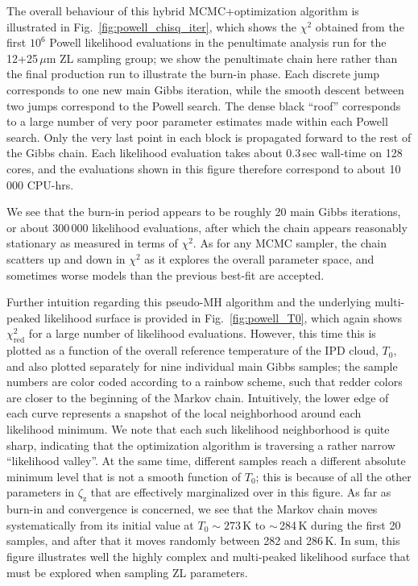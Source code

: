 \documentclass[twocolumn]{aa}
\begin{document}
The overall behaviour of this hybrid MCMC+optimization algorithm is
illustrated in Fig.~\ref{fig:powell_chisq_iter}, which shows the
$\chi^2$ obtained from the first $10^6$ Powell likelihood evaluations
in the penultimate analysis run for the 12+25\,$\mu$m ZL sampling
group; we show the penultimate chain here rather than the final
production run to illustrate the burn-in phase. Each discrete jump
corresponds to one new main Gibbs iteration, while the smooth descent
between two jumps correspond to the Powell search. The dense black
``roof'' corresponds to a large number of very poor parameter
estimates made within each Powell search. Only the very last point in
each block is propagated forward to the rest of the Gibbs chain. Each
likelihood evaluation takes about 0.3\,sec wall-time on 128 cores, and
the evaluations shown in this figure therefore correspond to about
10\,000 CPU-hrs.

We see that the burn-in period appears to be roughly 20 main Gibbs
iterations, or about 300\,000 likelihood evaluations, after which the
chain appears reasonably stationary as measured in terms of
$\chi^2$. As for any MCMC sampler, the chain scatters up and down in
$\chi^2$ as it explores the overall parameter space, and sometimes
worse models than the previous best-fit are accepted.

Further intuition regarding this pseudo-MH algorithm and the
underlying multi-peaked likelihood surface is provided in
Fig.~\ref{fig:powell_T0}, which again shows $\chi^2_{\mathrm{red}}$
for a large number of likelihood evaluations. However, this time this
is plotted as a function of the overall reference temperature of the
IPD cloud, $T_0$, and also plotted separately for nine individual main
Gibbs samples; the sample numbers are color coded according to a
rainbow scheme, such that redder colors are closer to the beginning of
the Markov chain. Intuitively, the lower edge of each curve represents
a snapshot of the local neighborhood around each likelihood
minimum. We note that each such likelihood neighborhood is quite
sharp, indicating that the optimization algorithm is traversing a
rather narrow ``likelihood valley''. At the same time, different
samples reach a different absolute minimum level that is not a smooth
function of $T_0$; this is because of all the other parameters in
$\zeta_{\mathrm{z}}$ that are effectively marginalized over in this
figure. As far as burn-in and convergence is concerned, we see that
the Markov chain moves systematically from its initial value at
$T_0\sim273\,$K to $\sim$\,284\,K during the first 20 samples, and
after that it moves randomly between 282 and 286\,K. In sum, this
figure illustrates well the highly complex and multi-peaked likelihood
surface that must be explored when sampling ZL parameters.
\end{document}

